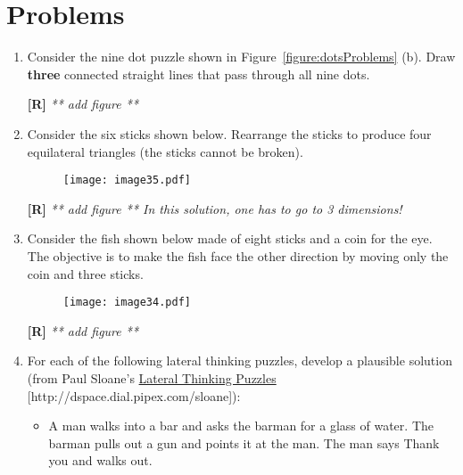 \section{Problems}
\label{section:conceptGenProblems}

\begin{enumerate}
\def\labelenumi{\arabic{enumi}.}
\item
  Consider the nine dot puzzle shown in Figure~\ref{figure:dotsProblems} (b). Draw
    \textbf{three} connected straight lines that pass through all nine
    dots.
    \begin{onlysolution}
    \textbf{[R]}
    \itshape
      ** add figure **
  \end{onlysolution}

\item
  Consider the six sticks shown below. Rearrange the sticks to produce
  four equilat­eral triangles (the sticks cannot be broken).
  
  \begin{figure}[h]
    \texttt{[image: image35.pdf]}
    \label{figure:sixSticks}
    \end{figure}

    \begin{onlysolution}
    \textbf{[R]}
    \itshape
      ** add figure **
    In this solution, one has to go to 3 dimensions!
  \end{onlysolution}

\item
  Consider the fish shown below made of eight sticks and a coin for the
  eye. The objective is to make the fish face the other direction by
  moving only the coin and three sticks.

  \begin{figure}[h]
  \texttt{[image: image34.pdf]}
  \label{figure:fishStickFigure}
  \end{figure}

  \begin{onlysolution}
    \textbf{[R]}
    \itshape
      ** add figure **
  \end{onlysolution}

\item
  For each of the following lateral thinking puzzles, develop a
  plausible solution (from Paul Sloane's \ul{Lateral Thinking Puzzles}
  {[}http://dspace.dial.pipex.com/sloane{]}):

\begin{itemize}
\item
  A man walks into a bar and asks the barman for a glass of water. The
  barman pulls out a gun and points it at the man. The man says
  \textquotesingle Thank you\textquotesingle{} and walks out.


\end{itemize}
\end{enumerate}
